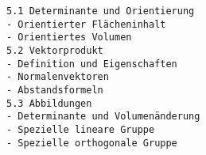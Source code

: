 \begin{verbatim}
5.1 Determinante und Orientierung
- Orientierter Flächeninhalt
- Orientiertes Volumen
5.2 Vektorprodukt
- Definition und Eigenschaften
- Normalenvektoren
- Abstandsformeln
5.3 Abbildungen
- Determinante und Volumenänderung
- Spezielle lineare Gruppe
- Spezielle orthogonale Gruppe
\end{verbatim}

